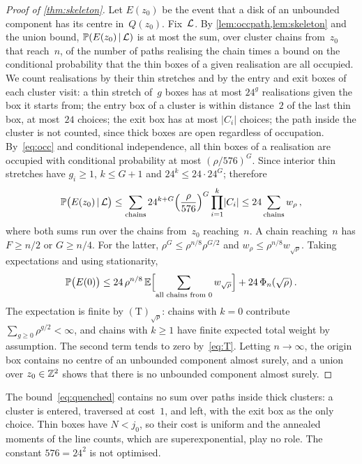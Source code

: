 \documentclass[11pt,letterpaper]{article}
\begin{document}
\begin{proof}[Proof of \cref{thm:skeleton}]
Let $E(z_0)$ be the event that a disk of an unbounded component has its centre in~$Q(z_0)$. Fix~$\mathcal L$. By \cref{lem:occpath,lem:skeleton} and the union bound, $\mathbb P(E(z_0)\,\vert\,\mathcal L)$ is at most the sum, over cluster chains from~$z_0$ that reach~$n$, of the number of paths realising the chain times a bound on the conditional probability that the thin boxes of a given realisation are all occupied. We count realisations by their thin stretches and by the entry and exit boxes of each cluster visit: a thin stretch of~$g$ boxes has at most $24^{g}$ realisations given the box it starts from; the entry box of a cluster is within distance~$2$ of the last thin box, at most~$24$ choices; the exit box has at most $\lvert C_i\rvert$ choices; the path inside the cluster is not counted, since thick boxes are open regardless of occupation. By~\eqref{eq:occ} and conditional independence, all thin boxes of a realisation are occupied with conditional probability at most $(\rho/576)^{G}$. Since interior thin stretches have $g_i\ge1$, $k\le G+1$ and $24^k\le24\cdot24^{G}$; therefore
\begin{equation}
\label{eq:quenched}
  \mathbb P\bigl(E(z_0)\,\vert\,\mathcal L\bigr)\le\sum_{\text{chains}}24^{k+G}\Bigl(\frac{\rho}{576}\Bigr)^{G}\prod_{i=1}^k\lvert C_i\rvert\le24\sum_{\text{chains}}w_\rho\,,
\end{equation}
where both sums run over the chains from~$z_0$ reaching~$n$. A chain reaching~$n$ has $F\ge n/2$ or $G\ge n/4$. For the latter, $\rho^{G}\le\rho^{n/8}\rho^{G/2}$ and $w_\rho\le\rho^{n/8}w_{\sqrt\rho}$. Taking expectations and using stationarity,
\begin{equation*}
  \mathbb P\bigl(E(0)\bigr)\le24\,\rho^{n/8}\,\mathbb E\Bigl[\sum_{\text{all chains from }0}w_{\sqrt\rho}\Bigr]+24\,\Phi_n(\sqrt\rho)\,.
\end{equation*}
The expectation is finite by $\mathrm{(T)}_{\sqrt\rho}$: chains with $k=0$ contribute $\sum_{g\ge0}\rho^{g/2}<\infty$, and chains with $k\ge1$ have finite expected total weight by assumption. The second term tends to zero by~\eqref{eq:T}. Letting $n\to\infty$, the origin box contains no centre of an unbounded component almost surely, and a union over $z_0\in\mathbb Z^2$ shows that there is no unbounded component almost surely.
\end{proof}

\begin{remark}
The bound~\eqref{eq:quenched} contains no sum over paths inside thick clusters: a cluster is entered, traversed at cost~$1$, and left, with the exit box as the only choice. Thin boxes have $N<j_0$, so their cost is uniform and the annealed moments of the line counts, which are superexponential, play no role. The constant $576=24^2$ is not optimised.
\end{remark}
\end{document}
